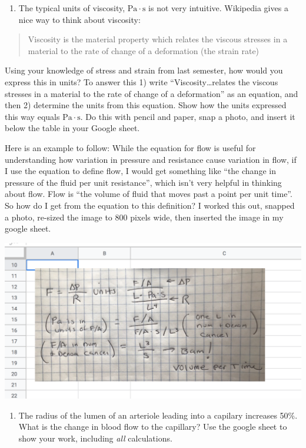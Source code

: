 \documentclass[]{book}
\providecommand{\tightlist}{%
  \setlength{\itemsep}{0pt}\setlength{\parskip}{0pt}}
\begin{document}
\begin{enumerate}
\def\labelenumi{\arabic{enumi}.}
\setcounter{enumi}{1}
\tightlist
\item
  The typical units of viscosity, \(\mathrm{Pa}\cdot \mathrm{s}\) is not
  very intuitive. Wikipedia gives a nice way to think about viscosity:
\end{enumerate}

\begin{quote}
Viscosity is the material property which relates the viscous stresses in
a material to the rate of change of a deformation (the strain rate)
\end{quote}

Using your knowledge of stress and strain from last semester, how would
you express this in units? To answer this 1) write
``Viscosity\ldots{}relates the viscous stresses in a material to the
rate of change of a deformation'' as an equation, and then 2) determine
the units from this equation. Show how the units expressed this way
equals \(\mathrm{Pa}\cdot \mathrm{s}\). Do this with pencil and paper,
snap a photo, and insert it below the table in your Google sheet.

Here is an example to follow: While the equation for flow is useful for
understanding how variation in pressure and resistance cause variation
in flow, if I use the equation to define flow, I would get something
like ``the change in pressure of the fluid per unit resistance'', which
isn't very helpful in thinking about flow. Flow is ``the volume of fluid
that moves past a point per unit time''. So how do I get from the
equation to this definition? I worked this out, snapped a photo,
re-sized the image to 800 pixels wide, then inserted the image in my
google sheet.

\includegraphics{images/flow-units.png}

\begin{enumerate}
\def\labelenumi{\arabic{enumi}.}
\setcounter{enumi}{2}
\tightlist
\item
  The radius of the lumen of an arteriole leading into a capilary
  increases 50\%. What is the change in blood flow to the capillary? Use
  the google sheet to show your work, including \emph{all} calculations.
\end{enumerate}
\end{document}
